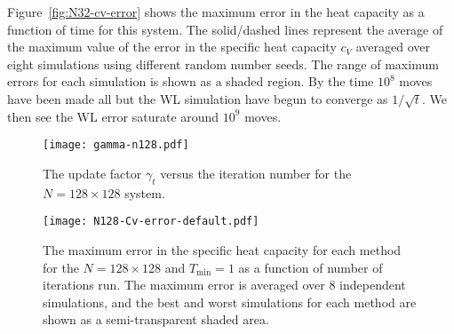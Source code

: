 Figure~\ref{fig:N32-cv-error} shows the maximum error in the heat capacity as a
function of time for this system. The solid/dashed lines represent the average
of the maximum value of the error in the specific heat capacity $c_V$ averaged
over eight simulations using different random number seeds. The range of maximum
errors for each simulation is shown as a shaded region. By
the time $10^8$ moves have been made all but the WL simulation have begun to
converge as $1/\sqrt{t}$. We then see the WL error saturate around $10^9$ moves.

\begin{figure}
\texttt{[image: gamma-n128.pdf]}
  \caption{
  The update factor $\gamma_t$ versus the iteration number for the $N=128 \times 128$
  system.}
  \label{fig:N128-gamma}
\end{figure}

\begin{figure}
  \texttt{[image: N128-Cv-error-default.pdf]}
  \caption{The maximum error in the specific heat capacity for each method for the $N=128 \times 128$ and $T_{\min} = 1$ as a function of number of iterations run.  The maximum error is averaged over 8 independent simulations, and the best and worst simulations for each method are shown as a semi-transparent shaded area.}
  \label{fig:N128-cv-error}
\end{figure}


